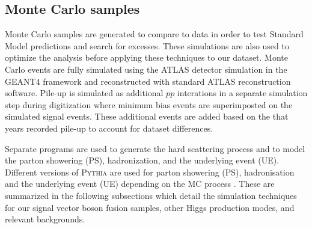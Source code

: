 \subsection{Monte Carlo samples}



Monte Carlo samples are generated to compare to data in order to test Standard Model predictions and search for excesses. These simulations are also used to optimize the analysis before applying these techniques to our dataset. Monte Carlo events are fully simulated using the ATLAS detector simulation in the GEANT4 framework \cite{GEANT4} and reconstructed with standard ATLAS reconstruction software. Pile-up is simulated as additional $pp$ interations in a separate simulation step during digitization where minimum bias events are superimposted on the simulated signal events. These additional events are added based on the that years recorded pile-up to account for dataset differences. 

Separate programs are used to generate the hard scattering process and to model the parton showering (PS), hadronization, and the underlying event (UE). Different versions of \textsc{Pythia} are used for parton showering (PS), hadronisation and the underlying event (UE) depending on the MC process \cite{pythia8}. These are summarized in the following subsections which detail the simulation techniques for our signal vector boson fusion samples, other Higgs production modes, and relevant backgrounds.   



